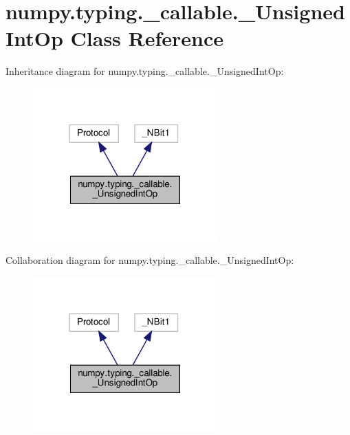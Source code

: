 \hypertarget{classnumpy_1_1typing_1_1__callable_1_1__UnsignedIntOp}{}\section{numpy.\+typing.\+\_\+callable.\+\_\+\+Unsigned\+Int\+Op Class Reference}
\label{classnumpy_1_1typing_1_1__callable_1_1__UnsignedIntOp}


Inheritance diagram for numpy.\+typing.\+\_\+callable.\+\_\+\+Unsigned\+Int\+Op\+:
\nopagebreak
\begin{figure}[H]
\begin{center}
\leavevmode
\includegraphics[width=200pt]{classnumpy_1_1typing_1_1__callable_1_1__UnsignedIntOp__inherit__graph}
\end{center}
\end{figure}


Collaboration diagram for numpy.\+typing.\+\_\+callable.\+\_\+\+Unsigned\+Int\+Op\+:
\nopagebreak
\begin{figure}[H]
\begin{center}
\leavevmode
\includegraphics[width=200pt]{classnumpy_1_1typing_1_1__callable_1_1__UnsignedIntOp__coll__graph}
\end{center}
\end{figure}
